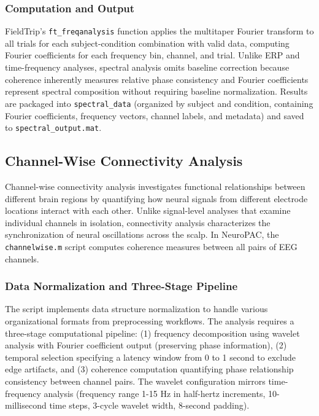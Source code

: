 \documentclass[12pt]{report}
\begin{document}
\subsubsection{Computation and Output}

FieldTrip's \verb|ft_freqanalysis| function applies the multitaper Fourier transform to all trials for each subject-condition combination with valid data, computing Fourier coefficients for each frequency bin, channel, and trial. Unlike ERP and time-frequency analyses, spectral analysis omits baseline correction because coherence inherently measures relative phase consistency and Fourier coefficients represent spectral composition without requiring baseline normalization. Results are packaged into \verb|spectral_data| (organized by subject and condition, containing Fourier coefficients, frequency vectors, channel labels, and metadata) and saved to \verb|spectral_output.mat|.

\subsection{Channel-Wise Connectivity Analysis}

Channel-wise connectivity analysis investigates functional relationships between different brain regions by quantifying how neural signals from different electrode locations interact with each other. Unlike signal-level analyses that examine individual channels in isolation, connectivity analysis characterizes the synchronization of neural oscillations across the scalp. In NeuroPAC, the \verb|channelwise.m| script computes coherence measures between all pairs of EEG channels.

\subsubsection{Data Normalization and Three-Stage Pipeline}

The script implements data structure normalization to handle various organizational formats from preprocessing workflows. The analysis requires a three-stage computational pipeline: (1) frequency decomposition using wavelet analysis with Fourier coefficient output (preserving phase information), (2) temporal selection specifying a latency window from 0 to 1 second to exclude edge artifacts, and (3) coherence computation quantifying phase relationship consistency between channel pairs. The wavelet configuration mirrors time-frequency analysis (frequency range 1-15 Hz in half-hertz increments, 10-millisecond time steps, 3-cycle wavelet width, 8-second padding).
\end{document}
